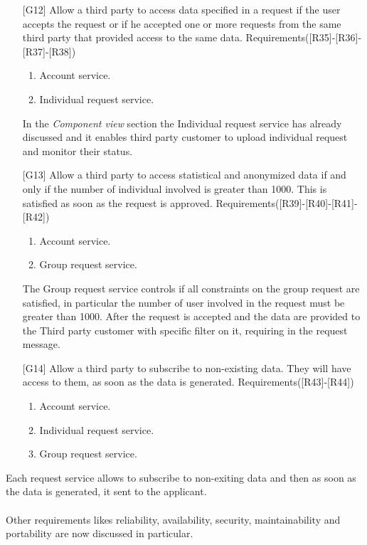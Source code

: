 \begin{itemize}
\item[{[G12]}] Allow a third party to access data specified in a request if the user accepts the request or if he accepted one or more requests from the same third party that provided access to the same data. Requirements([R35]-[R36]-[R37]-[R38])
	\begin{enumerate}
	\item Account service.
	\item Individual request service.
	\end{enumerate}
In the \textit{Component view} section the Individual request service has already discussed and it enables third party customer to upload individual request and monitor their status.	
	
\item[{[G13]}] Allow a third party to access statistical and anonymized data if and only if the number of individual involved is greater than 1000. This is satisfied as soon as the request is approved. Requirements([R39]-[R40]-[R41]-[R42])
	\begin{enumerate}
	\item Account service.
	\item Group request service.
	\end{enumerate}
The Group request service controls if all constraints on the group request are satisfied, in particular the number of user involved in the request must be greater than 1000. After the request is accepted and the data are provided to the Third party customer with specific filter on it, requiring in the request message.	
	
\item[{[G14]}] Allow a third party to subscribe to non-existing data. They will have access to them, as soon as the data is generated. Requirements([R43]-[R44])
	\begin{enumerate}
	\item Account service.
	\item Individual request service.
	\item Group request service.
	\end{enumerate}
\end{itemize}
Each request service allows to subscribe to non-exiting data and then as soon as the data is generated, it sent to the applicant.
\\
\\
Other requirements likes reliability, availability, security, maintainability and portability are now discussed in particular. \\
